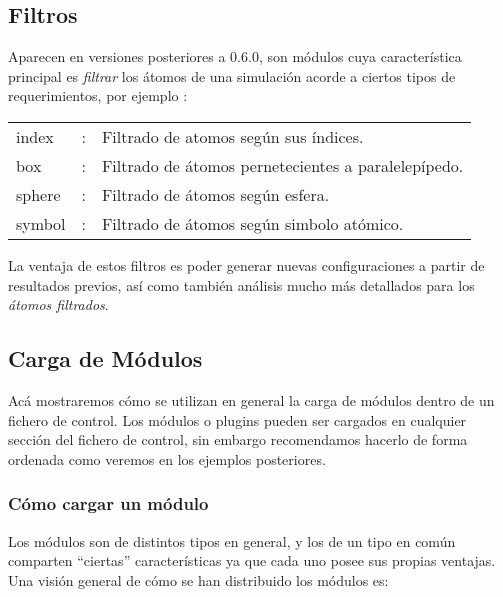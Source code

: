 \subsection{Filtros}

Aparecen en versiones posteriores a 0.6.0, son m\'odulos cuya caracter\'istica principal es \textit{filtrar} los \'atomos de una simulaci\'on acorde a ciertos tipos de requerimientos, por ejemplo :

\vspace{1cm}
\begin{center}
\begin{tabular}{lcl}
index &:& Filtrado de atomos seg\'un sus \'indices.\\
box &:& Filtrado de \'atomos pernetecientes a paralelep\'ipedo.\\
sphere &:& Filtrado de \'atomos seg\'un esfera.\\  
symbol &:& Filtrado de \'atomos seg\'un simbolo at\'omico.\\
\end{tabular}
\end{center}
\vspace{1cm}

La ventaja de estos filtros es poder generar nuevas configuraciones a partir de resultados previos, as\'i como tambi\'en an\'alisis mucho m\'as detallados para los \textit{\'atomos filtrados}.

\subsection{Carga de M\'odulos}

Ac\'a mostraremos c\'omo se utilizan en general la carga de m\'odulos dentro de un fichero de control. Los m\'odulos o plugins pueden ser cargados en cualquier secci\'on del fichero de control, sin embargo recomendamos hacerlo de forma ordenada como veremos en los ejemplos posteriores.

\subsubsection{C\'omo cargar un m\'odulo}

Los m\'odulos son de distintos tipos en general, y los de un tipo en com\'un comparten ``ciertas'' caracter\'isticas ya que cada uno posee sus propias ventajas. Una visi\'on general de c\'omo se han distribuido los m\'odulos es: 

